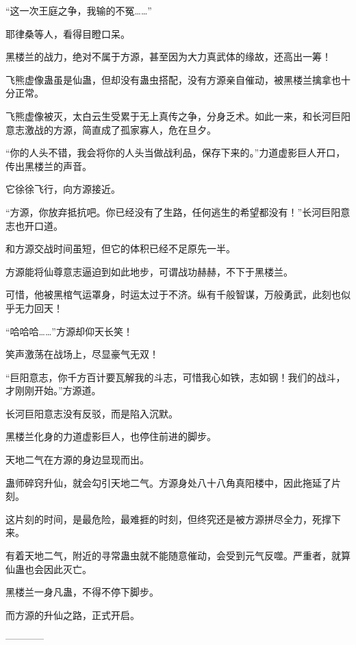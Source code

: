 \begin{this_body}
“这一次王庭之争，我输的不冤……”

耶律桑等人，看得目瞪口呆。

黑楼兰的战力，绝对不属于方源，甚至因为大力真武体的缘故，还高出一筹！

飞熊虚像蛊虽是仙蛊，但却没有蛊虫搭配，没有方源亲自催动，被黑楼兰擒拿也十分正常。

飞熊虚像被灭，太白云生受累于无上真传之争，分身乏术。如此一来，和长河巨阳意志激战的方源，简直成了孤家寡人，危在旦夕。

“你的人头不错，我会将你的人头当做战利品，保存下来的。”力道虚影巨人开口，传出黑楼兰的声音。

它徐徐飞行，向方源接近。

“方源，你放弃抵抗吧。你已经没有了生路，任何逃生的希望都没有！”长河巨阳意志也开口道。

和方源交战时间虽短，但它的体积已经不足原先一半。

方源能将仙尊意志逼迫到如此地步，可谓战功赫赫，不下于黑楼兰。

可惜，他被黑棺气运罩身，时运太过于不济。纵有千般智谋，万般勇武，此刻也似乎无力回天！

“哈哈哈……”方源却仰天长笑！

笑声激荡在战场上，尽显豪气无双！

“巨阳意志，你千方百计要瓦解我的斗志，可惜我心如铁，志如钢！我们的战斗，才刚刚开始。”方源道。

长河巨阳意志没有反驳，而是陷入沉默。

黑楼兰化身的力道虚影巨人，也停住前进的脚步。

天地二气在方源的身边显现而出。

蛊师碎窍升仙，就会勾引天地二气。方源身处八十八角真阳楼中，因此拖延了片刻。

这片刻的时间，是最危险，最难捱的时刻，但终究还是被方源拼尽全力，死撑下来。

有着天地二气，附近的寻常蛊虫就不能随意催动，会受到元气反噬。严重者，就算仙蛊也会因此灭亡。

黑楼兰一身凡蛊，不得不停下脚步。

而方源的升仙之路，正式开启。

------------

\end{this_body}

